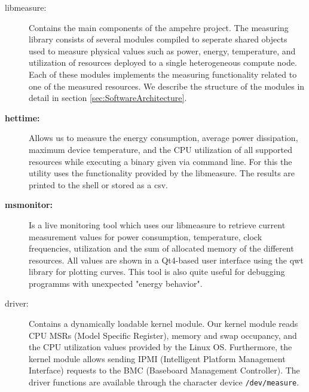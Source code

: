 \begin{description}
	\item[libmeasure:] Contains the main components of the ampehre project. The measuring library consists of several modules compiled to seperate shared objects used to measure physical values such as power, energy, temperature, and utilization of resources deployed to a single heterogeneous compute node. Each of these modules implements the measuring functionality related to one of the measured resources. We describe the structure of the modules in detail in section \ref{sec:SoftwareArchitecture}. 
% 	
	\item[\textbf{hettime:}] Allows us to measure the energy consumption, average power dissipation, maximum device temperature, and the CPU utilization of all supported resources while executing a binary given via command line. For this the utility uses the functionality provided by the libmeasure. The results are printed to the shell or stored as a csv.
	
	\item[\textbf{msmonitor:}] Is a live monitoring tool which uses our libmeasure to retrieve current measurement values for power consumption, temperature, clock frequencies, utilization and the sum of allocated memory of the different resources. All values are shown in a Qt4-based user interface using the qwt library for plotting curves. This tool is also quite useful for debugging programms with unexpected "energy behavior".
	
	\item[driver:] Contains a dynamically loadable kernel module. Our kernel module reads CPU MSRs (Model Specific Register), memory and swap occupancy, and the CPU utilization values provided by the Linux OS. Furthermore, the kernel module allows sending IPMI (Intelligent Platform Management Interface) requests to the BMC (Baseboard Management Controller). The driver functions are available through the character device \texttt{/dev/measure}.
	

\end{description}
